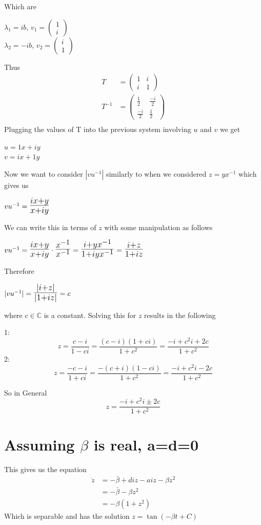 \documentclass[10pt]{article}
\def\mathLarge#1{\mbox{\LARGE $#1$}}
\begin{document}
Which are
\begin{center}
$\lambda_{1} = ib$, $v_{1} = \begin{pmatrix}1\\i\end{pmatrix}$\\
$\lambda_{2} = -ib$, $v_{2} = \begin{pmatrix}i\\1\end{pmatrix}$\\
\end{center}
Thus
\begin{align*}
T &= \begin{pmatrix}1&i\\i&1\end{pmatrix}\\
T^{-1} &= \begin{pmatrix}\frac{1}{2}&\frac{-i}{2}\\[6pt]\frac{-i}{2}&\frac{1}{2}\end{pmatrix}\\
\end{align*}
Plugging the values of T into the previous system involving $u$ and $v$ we get
\begin{center}
$u = 1x + iy$\\
$v = ix + 1y$
\end{center}
Now we want to consider $|vu^{-1}|$ similarly to when we considered $z=yx^{-1}$ which gives us
\begin{center}
$vu^{-1} = \mathLarge{\frac{ix + y}{x + iy}}$
\end{center}
We can write this in terms of $z$ with some manipulation as follows
\begin{center}
$vu^{-1} = \mathLarge{\frac{ix + y}{x + iy}}\cdot\mathLarge{\frac{x^{-1}}{x^{-1}}}=
\mathLarge{\frac{i + yx^{-1}}{1 + iyx^{-1}}} = \mathLarge{\frac{i + z}{1 + iz}}$
\end{center}
Therefore
\begin{center}
$|vu^{-1}| = \mathLarge{\frac{|i + z|}{|1 + iz|}} = c$
\end{center}
where $c \in \mathbb C$ is a constant. Solving this for $z$ results in the following


1:
$$z = \frac{c-i}{1-ci}=\frac{(c-i)(1+ci)}{1+c^2}=\frac{-i+c^2i+2c}{1+c^2}$$
2:
$$ z = \frac{-c-i}{1+ci}=\frac{-(c+i)(1-ci)}{{1+c^2}}=\frac{-i+c^2i-2c}{{1+c^2}}$$

So in General
$$ z = \frac{-i+c^2i\pm2c}{{1+c^2}}$$

\section{Assuming $\beta$ is real, a=d=0}
This gives us the equation
\begin{align*}
\dot z&=-\bar\beta+diz-aiz-\beta z^2\\
&=-\bar\beta-\beta z^2\\
&=-\beta(1+z^2)
\end{align*}
Which is separable and has the solution $z=\tan(-\beta t+C)$
\end{document}
